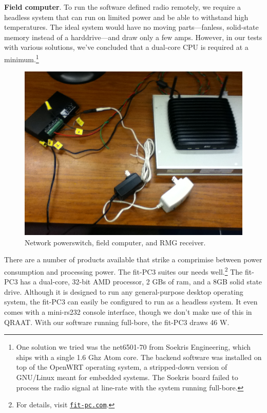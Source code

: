 \documentclass[letter]{article}
\newcounter{foot}
\begin{document}
\textbf{Field computer}. To run the software defined radio remotely, we require a headless system
that can run on limited power and be able to withstand high temperatures. The ideal system would 
have no moving parts---fanless, solid-state memory instead of a harddrive---and draw only a few 
amps. However, in our tests with various solutions, we've concluded that a dual-core CPU is 
required at a minimum.\footnote{One solution we tried was the net6501-70 from Soekris Engineering, which
ships with a single 1.6 Ghz Atom core. The backend software was installed on top of the OpenWRT operating 
system, a stripped-down version of GNU/Linux meant for embedded systems. The Soekris board failed to 
process the radio signal at line-rate with the system running full-bore.}
\begin{figure}
  \vspace{-10pt}
  \begin{center}
    \includegraphics[scale=0.24]{pictures/power_rmg_computer.JPG}
  \end{center}
  \caption{Network powerswitch, field computer, and RMG receiver.}
  \vspace{-10pt}
\end{figure}
There are a number of products available that strike a comprimise between power consumption 
and processing power. The fit-PC3 suites our needs well.\footnote{For details, visit
\href{http://www.fit-pc.com}{\tt fit-pc.com}.} The fit-PC3 has a dual-core, 32-bit AMD
processor, 2 GBs of ram, and a 8GB solid state drive. Although it is designed to run 
any general-purpose desktop operating system, the fit-PC3 can easily be configured to 
run as a headless system. It even comes with a mini-rs232 console interface, though 
we don't make use of this in QRAAT. With our software running full-bore, the fit-PC3 
draws 46 W. 
\end{document}
